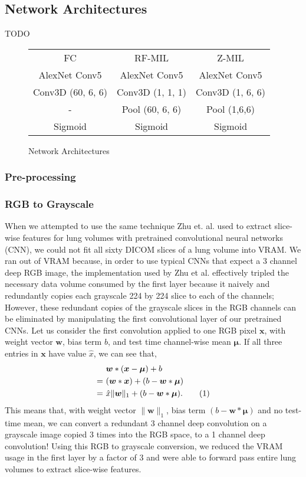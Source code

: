\documentclass[twocolumn,10pt]{article}
\newcommand{\red}[1]{{\color{red}#1}}
\newcommand{\temp}[1]{{\red{#1}\\}}
\renewcommand{\b}{\boldsymbol}
\newcommand\numberthis{\addtocounter{equation}{1}\tag{\theequation}}
\begin{document}
\subsection{Network Architectures}
\temp{TODO}
\begin{figure}
  \label{fig:architecture}
  \begin{center}
	\begin{tabular}{ | c |c| c| }
	\hline
	 FC & RF-MIL & Z-MIL\\
	\hhline{|=|=|=|}
	AlexNet Conv5 & AlexNet Conv5  & AlexNet Conv5  \\
	\hline
	{Conv3D  (60, 6, 6)} & Conv3D (1, 1, 1)  & Conv3D (1, 6, 6)   \\
	\hline
	- & Pool (60, 6, 6) & Pool (1,6,6) \\
	\hline
	Sigmoid & Sigmoid & Sigmoid \\
	\hline
	\end{tabular}	
  \end{center}
  \caption{Network Architectures}
\end{figure}

\subsubsection{Pre-processing}

\subsubsection{RGB to Grayscale}
When we attempted to use the same technique Zhu et. al. 
  used to extract slice-wise features for lung 
  volumes with pretrained convolutional neural networks (CNN),
  we could not fit all sixty DICOM slices of a lung volume
  into VRAM. 
  We ran out of VRAM because, in order to use typical CNNs that 
  expect a 3 channel deep RGB image, the implementation used by Zhu et al. 
  effectively tripled the necessary data volume consumed by the first layer because it
  naively and redundantly copies each grayscale 224 by 224 slice to each of the channels;
  However, these redundant copies of the
  grayscale slices in the RGB channels can be eliminated by manipulating the first convolutional
  layer of our pretrained CNNs. 
  Let us consider the first convolution applied to one RGB pixel $\b x$,  with weight vector $\b w$, 
  bias term $b$, and test time channel-wise mean $\b \mu$. 
  If all three
  entries in $\b x$ have value $\hat x$, we can see that,
  \begin{align*}
& \ \b w \ast (\b x - \b \mu) + b \\
= & \ (\b w \ast \b x) + (b - \b w \ast \b \mu)\\
= & \ \hat x \|\b w\|_1 + (b - \b w \ast \b \mu).
\numberthis
\end{align*}
  This means that, with weight vector $\|\b w\|_1$, bias term $(b - \b w \ast \b \mu)$ 
  and no test-time mean, we can convert a redundant 3 channel deep convolution on a
  grayscale image copied 3 times into the RGB space, to a 1 channel deep convolution!
  Using this RGB to grayscale conversion, we reduced the VRAM usage in the
  first layer by a factor of 3 and were able to forward pass entire
  lung volumes to extract slice-wise features.
\end{document}
